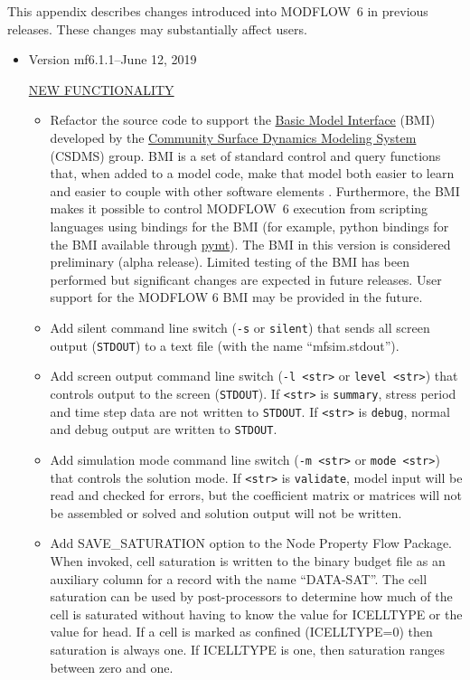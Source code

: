 This appendix describes changes introduced into MODFLOW~6 in previous releases. These changes may substantially affect users.

\begin{itemize}
	\item Version mf6.1.1--June 12, 2019

	\underline{NEW FUNCTIONALITY}
	\begin{itemize}
		\item Refactor the source code to support the \href{https://csdms.colorado.edu/wiki/BMI_Description}{Basic Model Interface} (BMI) developed by the \href{https://csdms.colorado.edu/wiki/Main_Page}{Community Surface Dynamics Modeling System} (CSDMS) group. BMI is a set of standard control and query functions that, when added to a model code, make that model both easier to learn and easier to couple with other software elements \citep{PECKHAM20133}. Furthermore, the BMI makes it possible to control MODFLOW~6 execution from scripting languages using bindings for the BMI (for example, python bindings for the BMI available through \href{https://csdms.colorado.edu/wiki/PyMT}{pymt}). The BMI in this version is considered preliminary (alpha release). Limited testing of the BMI has been performed but significant changes are expected in future releases.  User support for the MODFLOW 6 BMI may be provided in the future.
		\item Add silent command line switch (\texttt{-s} or \texttt{\doubledash silent}) that sends all screen output (\texttt{STDOUT}) to a text file (with the name ``mfsim.stdout'').
		\item Add screen output command line switch (\texttt{-l <str>} or \texttt{\doubledash level <str>}) that controls output to the screen (\texttt{STDOUT}). If \texttt{<str>}  is \texttt{summary}, stress period and time step data are not written to \texttt{STDOUT}. If \texttt{<str>} is \texttt{debug}, normal and debug output are written to \texttt{STDOUT}. 
		\item Add simulation mode command line switch (\texttt{-m <str>} or \texttt{\doubledash mode <str>}) that controls the solution mode. If \texttt{<str>}  is \texttt{validate}, model input will be read and checked for errors, but the coefficient matrix or matrices will not be assembled or solved and solution output will not be written.
		\item Add SAVE\_SATURATION option to the Node Property Flow Package.  When invoked, cell saturation is written to the binary budget file as an auxiliary column for a record with the name ``DATA-SAT''.  The cell saturation can be used by post-processors to determine how much of the cell is saturated without having to know the value for ICELLTYPE or the value for head. If a cell is marked as confined (ICELLTYPE=0) then saturation is always one. If ICELLTYPE is one, then saturation ranges between zero and one.

\end{itemize}
\end{itemize}
